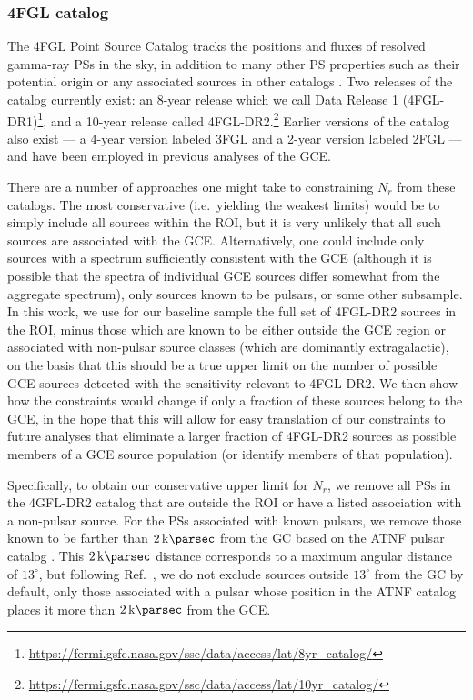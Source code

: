 \documentclass[letter,11pt]{article}
\begin{document}
\subsubsection{4FGL catalog}
The 4FGL Point Source Catalog tracks the positions and fluxes of resolved gamma-ray PSs in the sky, in addition to many other PS properties such as their potential origin or any associated sources in other catalogs \cite{Fermi-LAT:2019yla}. Two releases of the catalog currently exist: an 8-year release which we call Data Release 1 (4FGL-DR1)\footnote{\url{https://fermi.gsfc.nasa.gov/ssc/data/access/lat/8yr_catalog/}}, and a 10-year release called 4FGL-DR2.\footnote{\url{https://fermi.gsfc.nasa.gov/ssc/data/access/lat/10yr_catalog/}} Earlier versions of the catalog also exist --- a 4-year version labeled 3FGL and a 2-year version labeled 2FGL --- and have been employed in previous analyses of the GCE.

There are a number of approaches one might take to constraining $N_r$ from these catalogs. The most conservative (i.e.~yielding the weakest limits) would be to simply include all sources within the ROI, but it is very unlikely that all such sources are associated with the GCE. Alternatively, one could include only sources with a spectrum sufficiently consistent with the GCE (although it is possible that the spectra of individual GCE sources differ somewhat from the aggregate spectrum), only sources known to be pulsars, or some other subsample. In this work, we use for our baseline sample the full set of 4FGL-DR2 sources in the ROI, minus those which are known to be either outside the GCE region or associated with non-pulsar source classes (which are dominantly extragalactic), on the basis that this should be a true upper limit on the number of possible GCE sources detected with the sensitivity relevant to 4FGL-DR2. We then show how the constraints would change if only a fraction of these sources belong to the GCE, in the hope that this will allow for easy translation of our constraints to future analyses that eliminate a larger fraction of 4FGL-DR2 sources as possible members of a GCE source population (or identify members of that population).

Specifically, to obtain our conservative upper limit for $N_r$, we remove all PSs in the 4GFL-DR2 catalog that are outside the ROI or have a listed association with a non-pulsar source. For the PSs associated with known pulsars, we remove those known to be farther than $\SI{2}{\kilo\parsec}$ from the GC based on the ATNF pulsar catalog \cite{Hobbs04}. This $\SI{2}{\kilo\parsec}$ distance corresponds to a maximum angular distance of $13^\circ$, but following Ref.~\cite{Zhong:2019ycb}, we do not exclude sources outside $13^\circ$ from the GC by default, only those associated with a pulsar whose position in the ATNF catalog places it more than $\SI{2}{\kilo\parsec}$ from the GCE.
\end{document}
